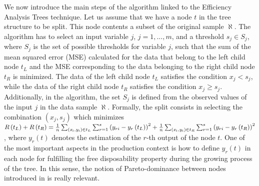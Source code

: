 We now introduce the main steps of the algorithm linked to the
Efficiency Analysis Trees technique. Let us assume that we have a node
\(t\) in the tree structure to be split. This node contents a subset of
the original sample \(\aleph\). The algorithm has to select an input
variable \(j\), \(j=1,...,m\), and a threshold \(s_{j} \in S_{j}\),
where \(S_{j}\) is the set of possible thresholds for variable \(j\),
such that the sum of the mean squared error (MSE) calculated for the
data that belong to the left child node \(t_{L}\) and the MSE
corresponding to the data belonging to the right child node \(t_{R}\) is
minimized. The data of the left child node \(t_{L}\) satisfies the
condition \(x_{j} <s_{j}\), while the data of the right child node
\(t_{R}\) satisfies the condition \(x_{j} \ge s_{j}\). Additionally, in
the algorithm, the set \(S_{j}\) is defined from the observed values of
the input \(j\) in the data sample \(\aleph\). Formally, the split
consists in selecting the combination \(\left(x_{j} ,s_{j} \right)\)
which minimizes
\(R\left(t_{L} \right)+R\left(t_{R} \right)=\frac{1}{n} \sum _{\left({\it x}_{i} ,{\it y}_{i} \right)\in t_{L} }\sum _{r=1}^{s}\left(y_{ri} -y_{r} \left(t_{L} \right)\right)^{2} +\frac{1}{n} \sum _{\left({\it x}_{i} ,{\it y}_{i} \right)\in t_{R} }\sum _{r=1}^{s}\left(y_{ri} -y_{r} \left(t_{R} \right)\right)^{2}\),
where \(y_{r} \left(t\right)\) denotes the estimation of the \(r\)-th
output of the node \(t\). One of the most important aspects in the
production context is how to define \(y_{r} \left(t\right)\) in each
node for fulfilling the free disposability property during the growing
process of the tree. In this sense, the notion of Pareto-dominance
between nodes introduced in \citet{esteve2020} is really relevant.

